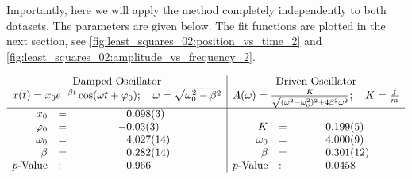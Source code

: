 Importantly, here we will apply the method completely independently to both datasets. The parameters are given below. The fit functions are plotted in the next section, see \autoref{fig:least_squares_02:position_vs_time_2} and \autoref{fig:least_squares_02:amplitude_vs_frequency_2}.

\begin{table}[ht]
    \caption{Determined parameters of the harmonic oscillators}
    \centering
    \(
    \begin{array}{rlS[table-format=+1.3(4)]|rlS[table-format=+1.3(4)]}
        \multicolumn{3}{c|}{\text{Damped Oscillator}} & \multicolumn{3}{c}{\text{Driven Oscillator}} \\
        \multicolumn{3}{c|}{x(t) = x_0 e^{- \beta t} \cos(\omega t + \varphi_0); \quad \omega = \sqrt{\omega_0^2 - \beta^2}} & \multicolumn{3}{c}{A(\omega) = \frac{K}{\sqrt{(\omega^2 - \omega_0^2)^2 + 4 \beta^2 \omega^2}}; \quad K = \frac{f}{m}} \\ \hline
        x_0       & = &  0.098 \pm 0.003 &          &   &                 \\
        \varphi_0 & = & -0.03  \pm 0.03  & K        & = & 0.199 \pm 0.005 \\
        \omega_0  & = &  4.027 \pm 0.014 & \omega_0 & = & 4.000 \pm 0.009 \\
        \beta     & = &  0.282 \pm 0.014 & \beta    & = & 0.301 \pm 0.012 \\
        p \text{-Value} & : &  0.966           & p \text{-Value} & : & 0.0458
    \end{array}
    \)
    \label{tab:least_squares:harmonic_oscillator_independent_fits}
\end{table}


